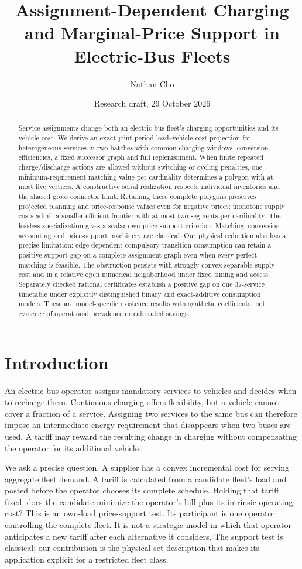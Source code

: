 \documentclass[11pt]{article}
\title{Assignment-Dependent Charging and Marginal-Price Support in Electric-Bus Fleets}
\author{Nathan Cho}
\date{Research draft, 29 October 2026}
\theoremstyle{definition}\newtheorem{definition}[theorem]{Definition}
\theoremstyle{remark}\newtheorem{remark}[theorem]{Remark}
\begin{document}
\maketitle
\begin{abstract}
Service assignments change both an electric-bus fleet's charging opportunities
and its vehicle cost. We derive an exact joint period-load--vehicle-cost projection
for heterogeneous services in two batches with common charging windows,
conversion efficiencies, a fixed successor graph and full replenishment.
When finite repeated charge/discharge actions are allowed without switching
or cycling penalties, one minimum-requirement matching value per cardinality
determines a polygon with at most five vertices. A constructive serial
realization respects individual inventories and the shared gross connector
limit. Retaining these complete polygons preserves projected planning and
price-response values even for negative prices; monotone supply costs admit
a smaller efficient frontier with at most two segments per cardinality.
The lossless specialization gives a scalar own-price support criterion.
Matching, conversion accounting and price-support machinery are classical.
Our physical reduction also has a precise limitation:
edge-dependent compulsory transition consumption can retain a positive support
gap on a complete assignment graph even when every perfect matching is feasible.
The obstruction persists with strongly convex separable supply cost and in a
relative open numerical neighborhood under fixed timing and access. Separately
checked rational certificates establish a positive gap on one 37-service
timetable under explicitly distinguished binary and exact-additive consumption
models. These are model-specific existence results with synthetic coefficients,
not evidence of operational prevalence or calibrated savings.
\end{abstract}
\section{Introduction}
An electric-bus operator assigns mandatory services to vehicles and decides
when to recharge them. Continuous charging offers flexibility, but a vehicle
cannot cover a fraction of a service. Assigning two services to the same bus
can therefore impose an intermediate energy requirement that disappears when
two buses are used. A tariff may reward the resulting change in charging
without compensating the operator for its additional vehicle.

We ask a precise question. A supplier has a convex incremental cost for
serving aggregate fleet demand. A tariff is calculated from a candidate
fleet's load and posted before the operator chooses its complete schedule.
Holding that tariff fixed, does the candidate minimize the operator's bill
plus its intrinsic operating cost? This is an own-load price-support test.
Its participant is one operator controlling the complete fleet. It is not a
strategic model in which that operator anticipates a new tariff after each
alternative it considers.
The support test is classical; our contribution is the physical set
description that makes its application explicit for a restricted fleet class.
\end{document}
